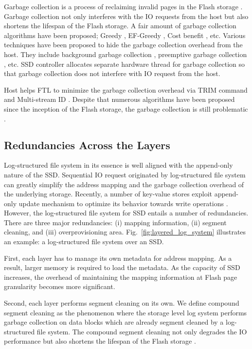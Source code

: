 \documentclass[pageno]{jpaper}
\begin{document}
Garbage collection is a process of reclaiming invalid pages in the
Flash storage \cite{agrawal2008design}. Garbage collection not only
interferes with the IO requests from the host but also shortens the
lifespan of the Flash storage. A fair amount of garbage collection
algorithms have been proposed; Greedy \cite{kawaguchi1995Flash},
EF-Greedy \cite{kwon2007ef}, Cost benefit \cite{rosenblum1992design},
etc.  Various techniques have been proposed to hide the garbage
collection overhead from the host. They include background garbage
collection \cite{smith2011garbage}, preemptive garbage collection
\cite{lee2011semi}, etc. SSD controller allocates separate
hardware thread for garbage collection so that garbage collection does
not interfere with IO request from the host.

Host helps FTL to minimize the garbage collection overhead via TRIM command
\cite{shu2007data} and Multi-stream ID \cite{kang2014multi}. Despite
that numerous algorithms have been proposed since the inception of the
Flash storage, the garbage collection is still problematic
\cite{zheng2015optimize, yang2015optimality}.



\subsection{Redundancies Across the Layers}
\label{subsec:stack_logs}

Log-structured file system in its essence is well aligned with the
append-only nature of the SSD. Sequential IO request originated by
log-structured file system can greatly simplify the address mapping
and the garbage collection overhead of the underlying storage.
Recently, a number of key-value stores exploit append-only update
mechanism to optimize its behavior towards write operations
\cite{lim2011silt, ghemawat2014leveldb}.  However, the log-structured
file system for SSD entails a number of redundancies. There are
three major redundancies:  (i)  mapping information,  (ii)  segment
cleaning, and  (iii)  overprovisioning area.
Fig.~\ref{fig:layered_log_system} illustrates an example: a
log-structured file system over an SSD.

First, each layer has to manage its own metadata for address
mapping. As a result, larger memory is required to load the
metadata. As the capacity of SSD increases, the overhead of
maintaining the mapping information at Flash page granularity becomes
more significant.

Second, each layer performs segment cleaning on its own. We define
compound segment cleaning as the phenomenon where the storage level
log system performs garbage collection on data blocks which are
already segment cleaned by a log-structured file system. The compound
segment cleaning not only degrades the IO performance but also
shortens the lifespan of the Flash storage  \cite{yang2014don,
lee2016application, zhang2016parafs}. 
\end{document}
